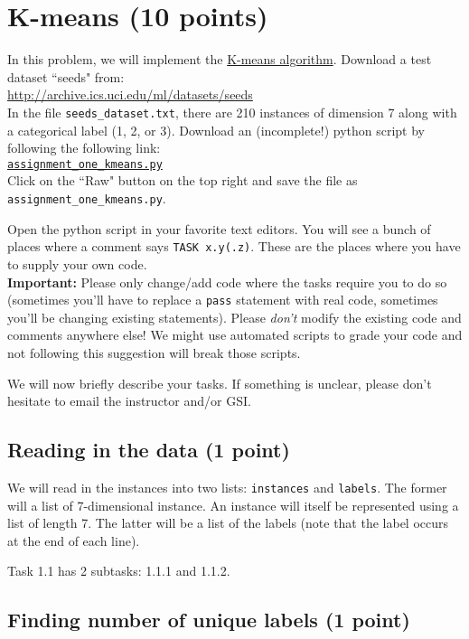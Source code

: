 \documentclass{article}
\begin{document}
\section{K-means (10 points)}

In this problem, we will implement the \href{http://en.wikipedia.org/wiki/K-means_clustering\#Standard_algorithm}{K-means algorithm}. Download a test dataset ``seeds" from:\\
\url{http://archive.ics.uci.edu/ml/datasets/seeds} \\
In the file {\tt seeds\_dataset.txt}, there are 210 instances of dimension 7 along with a categorical label (1, 2, or 3). Download an (incomplete!) python script by following the following
link:\\
\href{https://github.com/ambujtewari/stats607a-fall2014/blob/master/homeworks/assignment_one_kmeans.py}{\tt assignment\_one\_kmeans.py} \\
Click on the ``Raw" button on the top right and save the file as {\tt assignment\_one\_kmeans.py}.

Open the python script in your favorite text editors. You will see a bunch of places where a comment says {\tt TASK x.y(.z)}. These are the places where you have to supply your
own code.\\
{\bf Important:} Please only change/add code where the tasks require you to do so (sometimes you'll have to replace a {\tt pass} statement with real code, sometimes you'll be changing existing statements). Please {\em don't} modify the existing code and comments anywhere else! We might use automated scripts to grade your code and not following this suggestion will break those scripts.

We will now briefly describe your tasks. If something is unclear, please don't hesitate to email the instructor and/or GSI.

\subsection{Reading in the data (1 point)}

We will read in the instances into two lists: {\tt instances} and {\tt labels}. The former will a list of 7-dimensional instance. An instance will itself be represented using a list of length 7.
The latter will be a list of the labels (note that the label occurs at the end of each line).

Task 1.1 has 2 subtasks: 1.1.1 and 1.1.2.

\subsection{Finding number of unique labels (1 point)}
\end{document}
